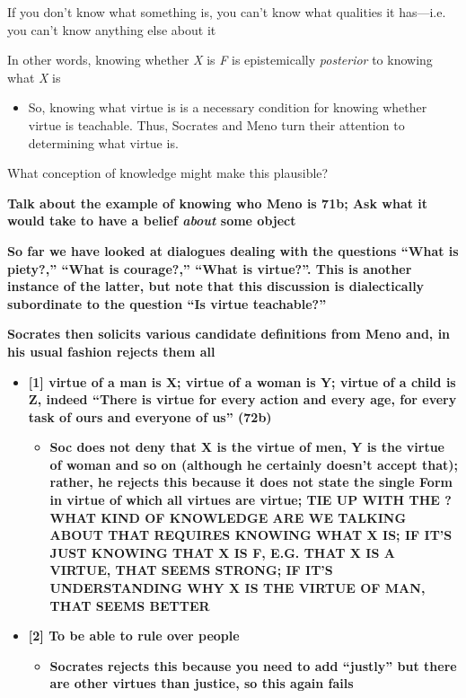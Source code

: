 \documentclass[11pt]{article}
\begin{document}
\noindent If you don't know what something is, you can't know what qualities it has---i.e. you can't know anything else about it
\vspace*{2mm}

\noindent In other words, knowing whether \emph{X} is \emph{F} is epistemically \emph{posterior} to knowing what \emph{X} is

\begin{itemize}\item{So, knowing what virtue is is a necessary condition for knowing whether virtue is teachable. Thus, Socrates and Meno turn their attention to determining what virtue is.}\end{itemize}

\noindent What conception of knowledge might make this plausible?
\vspace*{2mm}

\noindent \textbf{Talk about the example of knowing who Meno is 71b; Ask what it would take to have a belief \emph{about} some object}
\vspace*{2mm}

\noindent \textbf{So far we have looked at dialogues dealing with the questions ``What is piety?,'' ``What is courage?,'' ``What is virtue?''. This is another instance of the latter, but note that this discussion is dialectically subordinate to the question ``Is virtue teachable?''}
\vspace*{2mm}

\noindent \textbf{Socrates then solicits various candidate definitions from Meno and, in his usual fashion rejects them all}

\begin{itemize}\item{\textbf{[1] virtue of a man is X; virtue of a woman is Y; virtue of a child is Z, indeed ``There is virtue for every action and every age, for every task of ours and everyone of us'' (72b)}}\begin{itemize}\item{\textbf{Soc does not deny that X is the virtue of men, Y is the virtue of woman and so on (although he certainly doesn't accept that); rather, he rejects this because it does not state the single Form in virtue of which all virtues are virtue; TIE UP WITH THE ? WHAT KIND OF KNOWLEDGE ARE WE TALKING ABOUT THAT REQUIRES KNOWING WHAT X IS; IF IT'S JUST KNOWING THAT X IS F, E.G. THAT X IS A VIRTUE, THAT SEEMS STRONG; IF IT'S UNDERSTANDING WHY X IS THE VIRTUE OF MAN, THAT SEEMS BETTER}}\end{itemize}\item{\textbf{[2] To be able to rule over people}}\begin{itemize}\item{\textbf{Socrates rejects this because you need to add ``justly'' but there are other virtues than justice, so this again fails}}\end{itemize}\end{itemize}
\end{document}
